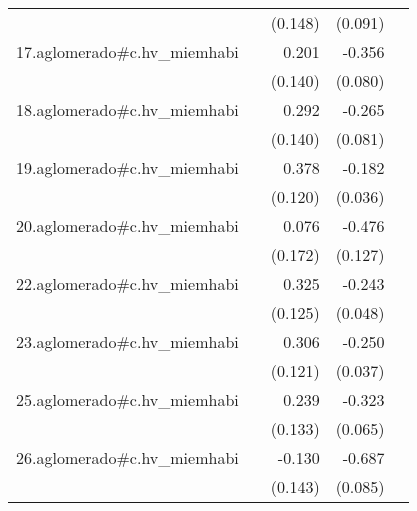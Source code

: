 {\begin{longtable}{l*{4}{D{.}{.}{-1}}}
            &                     &     (0.148)         &     (0.091)         &                     \\
\addlinespace
17.aglomerado#c.hv\_miemhabi&                     &       0.201         &      -0.356\sym{***}&                     \\
            &                     &     (0.140)         &     (0.080)         &                     \\
\addlinespace
18.aglomerado#c.hv\_miemhabi&                     &       0.292\sym{*}  &      -0.265\sym{**} &                     \\
            &                     &     (0.140)         &     (0.081)         &                     \\
\addlinespace
19.aglomerado#c.hv\_miemhabi&                     &       0.378\sym{**} &      -0.182\sym{***}&                     \\
            &                     &     (0.120)         &     (0.036)         &                     \\
\addlinespace
20.aglomerado#c.hv\_miemhabi&                     &       0.076         &      -0.476\sym{***}&                     \\
            &                     &     (0.172)         &     (0.127)         &                     \\
\addlinespace
22.aglomerado#c.hv\_miemhabi&                     &       0.325\sym{**} &      -0.243\sym{***}&                     \\
            &                     &     (0.125)         &     (0.048)         &                     \\
\addlinespace
23.aglomerado#c.hv\_miemhabi&                     &       0.306\sym{*}  &      -0.250\sym{***}&                     \\
            &                     &     (0.121)         &     (0.037)         &                     \\
\addlinespace
25.aglomerado#c.hv\_miemhabi&                     &       0.239         &      -0.323\sym{***}&                     \\
            &                     &     (0.133)         &     (0.065)         &                     \\
\addlinespace
26.aglomerado#c.hv\_miemhabi&                     &      -0.130         &      -0.687\sym{***}&                     \\
            &                     &     (0.143)         &     (0.085)         &                     \\

\end{longtable}}

